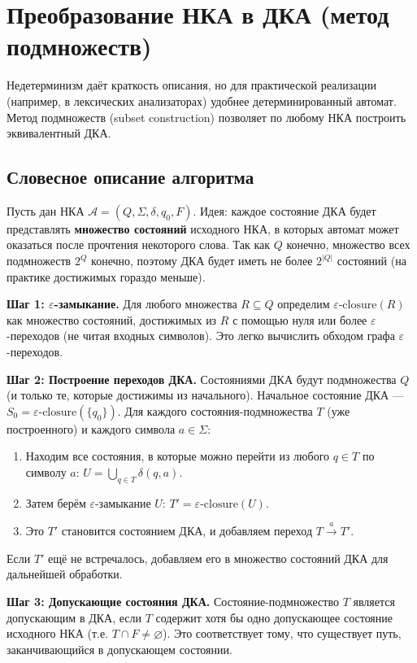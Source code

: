 \documentclass[12pt,a4paper]{article}
\theoremstyle{definition}
\newcommand{\A}{\mathcal{A}}
\begin{document}
\section{Преобразование НКА в ДКА (метод подмножеств)}\label{sec:nfa2dfa}
Недетерминизм даёт краткость описания, но для практической реализации (например, в лексических анализаторах) удобнее детерминированный автомат. Метод подмножеств (subset construction) позволяет по любому НКА построить эквивалентный ДКА.

\subsection{Словесное описание алгоритма}

Пусть дан НКА $\A = (Q, \Sigma, \delta, q_0, F)$. Идея: каждое состояние ДКА будет представлять \textbf{множество состояний} исходного НКА, в которых автомат может оказаться после прочтения некоторого слова. Так как $Q$ конечно, множество всех подмножеств $2^Q$ конечно, поэтому ДКА будет иметь не более $2^{|Q|}$ состояний (на практике достижимых гораздо меньше).

\textbf{Шаг 1: $\varepsilon$-замыкание.} Для любого множества $R\subseteq Q$ определим $\varepsilon\text{-closure}(R)$ как множество состояний, достижимых из $R$ с помощью нуля или более $\varepsilon$-переходов (не читая входных символов). Это легко вычислить обходом графа $\varepsilon$-переходов.

\textbf{Шаг 2: Построение переходов ДКА.}  
Состояниями ДКА будут подмножества $Q$ (и только те, которые достижимы из начального). Начальное состояние ДКА — $S_0 = \varepsilon\text{-closure}(\{q_0\})$.  
Для каждого состояния-подмножества $T$ (уже построенного) и каждого символа $a\in\Sigma$:
\begin{enumerate}
\item Находим все состояния, в которые можно перейти из любого $q\in T$ по символу $a$: $U = \bigcup_{q\in T} \delta(q,a)$.
\item Затем берём $\varepsilon$-замыкание $U$: $T' = \varepsilon\text{-closure}(U)$.
\item Это $T'$ становится состоянием ДКА, и добавляем переход $T \xrightarrow{a} T'$.
\end{enumerate}
Если $T'$ ещё не встречалось, добавляем его в множество состояний ДКА для дальнейшей обработки.

\textbf{Шаг 3: Допускающие состояния ДКА.} Состояние-подмножество $T$ является допускающим в ДКА, если $T$ содержит хотя бы одно допускающее состояние исходного НКА (т.е. $T\cap F \neq \varnothing$). Это соответствует тому, что существует путь, заканчивающийся в допускающем состоянии.
\end{document}
